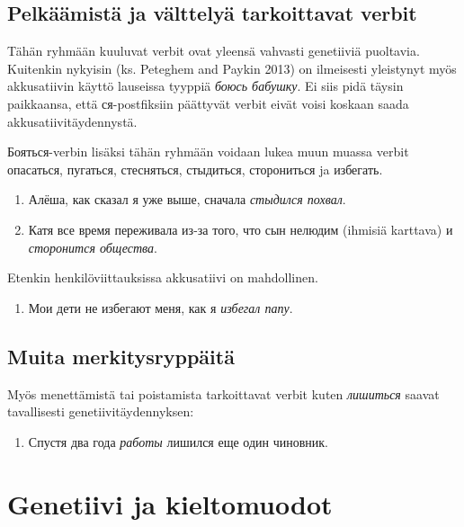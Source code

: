 \documentclass[]{scrreprt}
\providecommand{\tightlist}{%
  \setlength{\itemsep}{0pt}\setlength{\parskip}{0pt}}
\begin{document}
\subsection{Pelkäämistä ja välttelyä tarkoittavat
verbit}\label{pelkuxe4uxe4mistuxe4-ja-vuxe4lttelyuxe4-tarkoittavat-verbit}

Tähän ryhmään kuuluvat verbit ovat yleensä vahvasti genetiiviä
puoltavia. Kuitenkin nykyisin (ks. Peteghem and Paykin 2013) on
ilmeisesti yleistynyt myös akkusatiivin käyttö lauseissa tyyppiä
\emph{боюсь бабушку}. Ei siis pidä täysin paikkaansa, että
ся-postfiksiin päättyvät verbit eivät voisi koskaan saada
akkusatiivitäydennystä.

Бояться-verbin lisäksi tähän ryhmään voidaan lukea muun muassa verbit
опасаться, пугаться, стесняться, стыдиться, сторониться ja избегать.

\begin{enumerate}
\def\labelenumi{(\arabic{enumi})}
\setcounter{enumi}{55}
\tightlist
\item
  Алёша, как сказал я уже выше, сначала \emph{стыдился похвал}.
\item
  Катя все время переживала из-за того, что сын нелюдим (ihmisiä
  karttava) и \emph{сторонится общества}.
\end{enumerate}

Etenkin henkilöviittauksissa akkusatiivi on mahdollinen.

\begin{enumerate}
\def\labelenumi{(\arabic{enumi})}
\setcounter{enumi}{57}
\tightlist
\item
  Мои дети не избегают меня, как я \emph{избегал папу}.
\end{enumerate}

\subsection{Muita
merkitysryppäitä}\label{muita-merkitysryppuxe4ituxe4}

Myös menettämistä tai poistamista tarkoittavat verbit kuten
\emph{лишиться} saavat tavallisesti genetiivitäydennyksen:

\begin{enumerate}
\def\labelenumi{(\arabic{enumi})}
\setcounter{enumi}{58}
\tightlist
\item
  Спустя два года \emph{работы} лишился еще один чиновник.
\end{enumerate}

\section{Genetiivi ja kieltomuodot}\label{genetiivi-ja-kieltomuodot}
\end{document}

